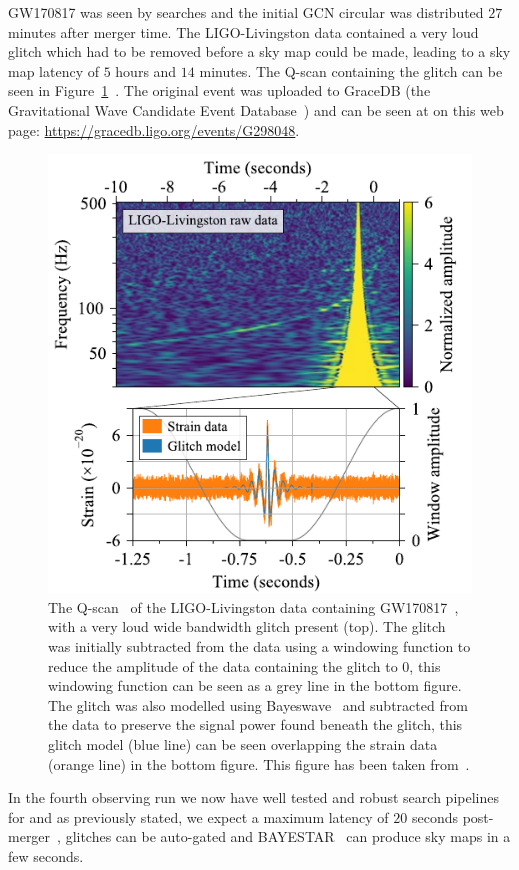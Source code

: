 GW170817 was seen by \gwadj searches and the initial GCN circular was distributed $27$ minutes after merger time. The LIGO-Livingston data contained a very loud glitch which had to be removed before a sky map could be made, leading to a sky map latency of $5$ hours and $14$ minutes. The Q-scan containing the glitch can be seen in Figure~\ref{6:fig:gw170817_glitch}~\cite{GW170817:2017}. The original event was uploaded to GraceDB (the Gravitational Wave Candidate Event Database~\cite{ligo_gracedb:2024}) and can be seen at on this web page: \href{https://gracedb.ligo.org/events/G298048}{https://gracedb.ligo.org/events/G298048}.
%
\begin{figure}
    \centering
    \includegraphics[width=1.0\linewidth]{images/6_earlywarning/gw170817/GW170817_glitch_subtraction.pdf}
    \caption{The Q-scan~\cite{qscan:2004} of the LIGO-Livingston data containing GW170817~\cite{GW170817:2017}, with a very loud wide bandwidth glitch present (top). The glitch was initially subtracted from the data using a windowing function to reduce the amplitude of the data containing the glitch to $0$, this windowing function can be seen as a grey line in the bottom figure. The glitch was also modelled using Bayeswave~\cite{BayesWave:2015} and subtracted from the data to preserve the \gwadj signal power found beneath the glitch, this glitch model (blue line) can be seen overlapping the strain data (orange line) in the bottom figure. This figure has been taken from~\cite{GW170817:2017}.}
    \label{6:fig:gw170817_glitch}
\end{figure}
%
In the fourth observing run we now have well tested and robust search pipelines for \gws and as previously stated, we expect a maximum latency of $20$ seconds post-merger~\cite{PyCBC_Live:2018}, glitches can be auto-gated and BAYESTAR~\cite{BAYESTAR:2016} can produce sky maps in a few seconds.

